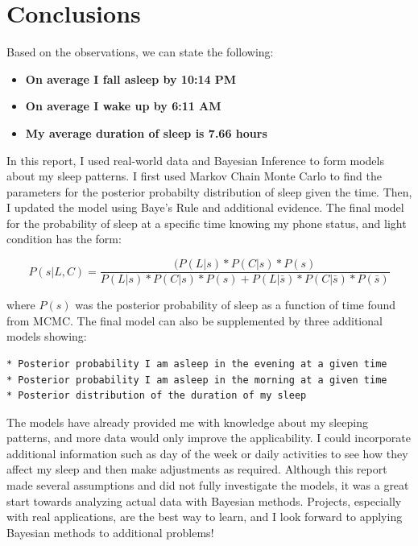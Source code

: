 \documentclass[12pt]{article}
\providecommand{\tightlist}{%
      \setlength{\itemsep}{0pt}\setlength{\parskip}{0pt}}
\begin{document}
    \hypertarget{conclusions}{%
\section{Conclusions}\label{conclusions}}

Based on the observations, we can state the following:

\begin{itemize}
\tightlist
\item
  \textbf{On average I fall asleep by 10:14 PM}
\item
  \textbf{On average I wake up by 6:11 AM}
\item
  \textbf{My average duration of sleep is 7.66 hours}
\end{itemize}

In this report, I used real-world data and Bayesian Inference to form
models about my sleep patterns. I first used Markov Chain Monte Carlo to
find the parameters for the posterior probabilty distribution of sleep
given the time. Then, I updated the model using Baye's Rule and
additional evidence. The final model for the probability of sleep at a
specific time knowing my phone status, and light condition has the form:

\[P(s | L, C) = \frac{(P(L|s) * P(C|s) * P(s)}{P(L|s) * P(C|s) * P(s) + P(L|\bar{s}) * P(C|\bar{s}) * P(\bar{s})}\]

where \(P(s)\) was the posterior probability of sleep as a function of
time found from MCMC. The final model can also be supplemented by three
additional models showing:

\begin{verbatim}
* Posterior probability I am asleep in the evening at a given time
* Posterior probability I am asleep in the morning at a given time
* Posterior distribution of the duration of my sleep 
\end{verbatim}

The models have already provided me with knowledge about my sleeping
patterns, and more data would only improve the applicability. I could
incorporate additional information such as day of the week or daily
activities to see how they affect my sleep and then make adjustments as
required. Although this report made several assumptions and did not
fully investigate the models, it was a great start towards analyzing
actual data with Bayesian methods. Projects, especially with real
applications, are the best way to learn, and I look forward to applying
Bayesian methods to additional problems!


    
    
    
    
\end{document}
